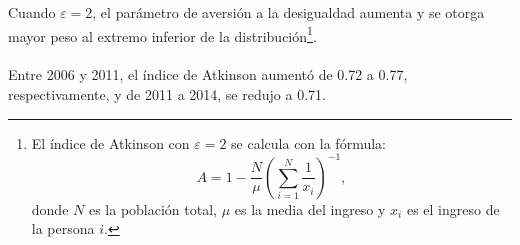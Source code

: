 Cuando $\varepsilon = \mbox{2}$, el parámetro de aversión a la desigualdad aumenta y se otorga mayor peso al extremo inferior de la distribución\footnote{El índice de Atkinson con $\varepsilon = \mbox{2} $ se calcula con la fórmula: 
	\[ A = 1 - \frac{N}{\mu}\left( \sum_{i=1}^{N}\frac{1}{x_i} \right)^{-1}, \] donde $N$ es la población total, $\mu$ es la media del ingreso y $x_i$ es el ingreso de la persona $i$.}. \\\\ Entre 2006 y 2011, el índice de Atkinson aumentó de 0.72 a 0.77, respectivamente, y de 2011 a 2014, se redujo a 0.71.  
